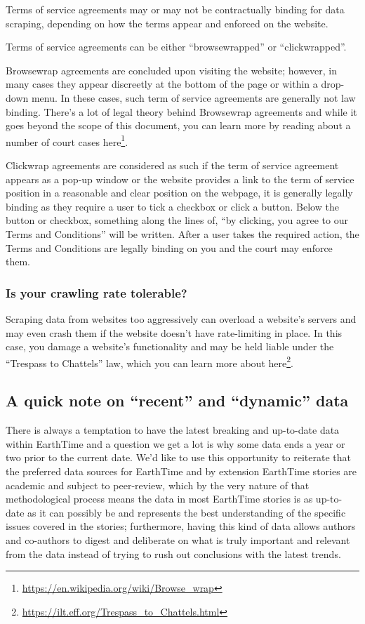 \documentclass[
  12pt,
]{krantz}
\renewcommand{\href}[2]{#2\footnote{\url{#1}}}
\begin{document}
Terms of service agreements may or may not be contractually binding for data scraping, depending on how the terms appear and enforced on the website.

Terms of service agreements can be either ``browsewrapped'' or ``clickwrapped''.

Browsewrap agreements are concluded upon visiting the website; however, in many cases they appear discreetly at the bottom of the page or within a drop-down menu. In these cases, such term of service agreements are generally not law binding. There's a lot of legal theory behind Browsewrap agreements and while it goes beyond the scope of this document, you can learn more by reading about a number of court cases \href{https://en.wikipedia.org/wiki/Browse_wrap}{here}.

Clickwrap agreements are considered as such if the term of service agreement appears as a pop-up window or the website provides a link to the term of service position in a reasonable and clear position on the webpage, it is generally legally binding as they require a user to tick a checkbox or click a button. Below the button or checkbox, something along the lines of, ``by clicking, you agree to our Terms and Conditions'' will be written. After a user takes the required action, the Terms and Conditions are legally binding on you and the court may enforce them.

\hypertarget{is-your-crawling-rate-tolerable}{%
\subsubsection*{Is your crawling rate tolerable?}\label{is-your-crawling-rate-tolerable}}


Scraping data from websites too aggressively can overload a website's servers and may even crash them if the website doesn't have rate-limiting in place. In this case, you damage a website's functionality and may be held liable under the ``Trespass to Chattels'' law, which you can learn more about \href{https://ilt.eff.org/Trespass_to_Chattels.html}{here}.

\hypertarget{a-quick-note-on-recent-and-dynamic-data}{%
\subsection{A quick note on ``recent'' and ``dynamic'' data}\label{a-quick-note-on-recent-and-dynamic-data}}

There is always a temptation to have the latest breaking and up-to-date data within EarthTime and a question we get a lot is why some data ends a year or two prior to the current date. We'd like to use this opportunity to reiterate that the preferred data sources for EarthTime and by extension EarthTime stories are academic and subject to peer-review, which by the very nature of that methodological process means the data in most EarthTime stories is as up-to-date as it can possibly be and represents the best understanding of the specific issues covered in the stories; furthermore, having this kind of data allows authors and co-authors to digest and deliberate on what is truly important and relevant from the data instead of trying to rush out conclusions with the latest trends.
\end{document}
